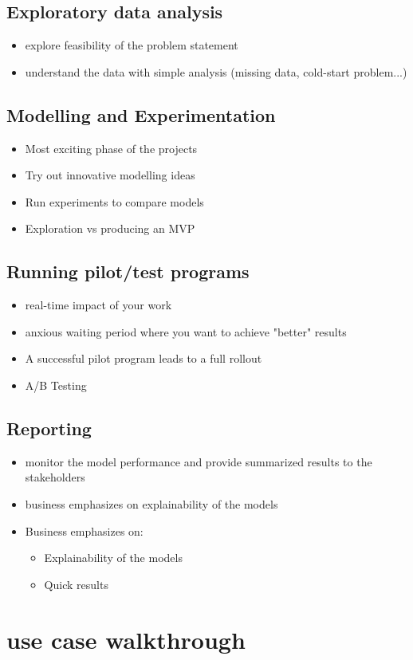\documentclass[11pt]{article}
\theoremstyle{definition}
\begin{document}
\subsection{Exploratory data analysis}
\begin{itemize}
    \item explore feasibility of the problem statement
    \item understand the data with simple analysis (missing data, cold-start problem...)
\end{itemize}

\subsection{Modelling and Experimentation}
\begin{itemize}
    \item Most exciting phase of the projects
    \item Try out innovative modelling ideas
    \item Run experiments to compare models
    \item Exploration vs producing an MVP
\end{itemize}

\subsection{Running pilot/test programs}
\begin{itemize}
    \item real-time impact of your work
    \item anxious waiting period where you want to achieve "better" results
    \item A successful pilot program leads to a full rollout
    \item A/B Testing
\end{itemize}

\subsection{Reporting}
\begin{itemize}
    \item monitor the model performance and provide summarized results to the stakeholders
    \item business emphasizes on explainability of the models
    \item Business emphasizes on:
    \begin{itemize}
        \item Explainability of the models
        \item Quick results
    \end{itemize}
\end{itemize}

\section{use case walkthrough}
\end{document}
